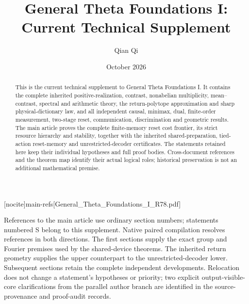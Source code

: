 
[nocite]{main-refs}[General_Theta_Foundations_I_R78.pdf]
\renewcommand{\thesection}{S\arabic{section}}
\title[Current technical supplement]{General Theta Foundations I:\\Current Technical Supplement}
\author{Qian Qi}\date{October 2026}

\begin{abstract}
This is the current technical supplement to General Theta Foundations I.
It contains the complete inherited positive-realization, contrast,
nonabelian multiplicity, mean--contrast, spectral and arithmetic theory,
the return-polytope approximation and sharp physical-dictionary law,
and all independent causal, minimax, dual, finite-order measurement,
two-stage reset, communication, discrimination and geometric results.
The main article proves the complete finite-memory reset cost frontier,
its strict resource hierarchy and stability, together with the inherited
shared-preparation, tied-action reset-memory and unrestricted-decoder
certificates.  The statements retained here
keep their individual hypotheses and full proof bodies.  Cross-document
references and the theorem map identify their actual logical roles;
historical preservation is not an additional mathematical premise.
\end{abstract}
\maketitle
\noindent References to the main article use ordinary section numbers;
statements numbered S belong to this supplement.  Native paired
compilation resolves references in both directions.  The first sections
supply the exact group and Fourier premises used by the shared-device
theorems.  The inherited return geometry supplies the upper counterpart
to the unrestricted-decoder lower.  Subsequent sections retain the
complete independent developments.  Relocation does not change a
statement's hypotheses or priority; two explicit output-visible-core
clarifications from the parallel author branch are identified in the
source-provenance and proof-audit records.





















